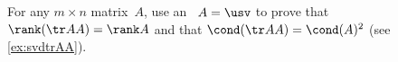 \begin{exercise} \label{ex:ctrAA} 
For any \(m\times n\) matrix~\(A\), use an \svd\ \(A=\usv\) to prove that \(\rank(\tr AA)=\rank A\) and that \(\cond(\tr AA)=\cond(A)^2\)
(see \cref{ex:svdtrAA}).
\end{exercise}





%





